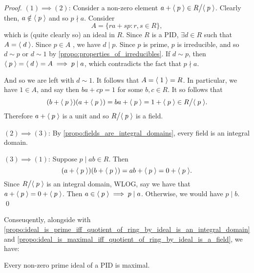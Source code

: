 \begin{proof}
  $(1) \implies (2)$: Consider a non-zero element $a + \langle \; p \; \rangle \in R \big/ \langle \; p \; \rangle$. Clearly then, $a \notin \langle \; p \; \rangle$ and so $p \nmid a$. Consider
  \begin{equation*}
    A = \{ ra + sp : r, s \in R \},
  \end{equation*}
  which is (quite clearly so) an ideal in $R$. Since $R$ is a PID, $\exists d \in R$ such that $A = \langle \; d \; \rangle$. Since $p \in A$ , we have $d \mid p$. Since $p$ is prime, $p$ is irreducible, and so $d \sim p$ or $d \sim 1$ by \cref{propo:properties_of_irreducibles}. If $d \sim p$, then $\langle \; p \; \rangle = \langle \; d \; \rangle = A \implies p \mid a$, which contradicts the fact that $p \nmid a$.

  And so we are left with $d \sim 1$. It follows that $A = \langle \; 1 \; \rangle = R$. In particular, we have $1 \in A$, and say then $ba + cp = 1$ for some $b, c \in R$. It so follows that
  \begin{equation*}
    (b + \langle \; p \; \rangle)(a + \langle \; p \; \rangle) = ba + \langle \; p \; \rangle = 1 + \langle \; p \; \rangle \in R \big/ \langle \; p \; \rangle.
  \end{equation*}
  Therefore $a + \langle \; p \; \rangle$ is a unit and so $R \big/ \langle \; p \; \rangle$ is a field.

  \noindent $(2) \implies (3)$: By \cref{propo:fields_are_integral_domains}, every field is an integral domain.

  \noindent $(3) \implies (1)$: Suppose $p \mid ab \in R$. Then
  \begin{equation*}
    (a + \langle \; p \; \rangle) (b + \langle \; p \; \rangle) = ab + \langle \; p \; \rangle = 0 + \langle \; p \; \rangle.
  \end{equation*}
  Since $R \big/ \langle \; p \; \rangle$ is an integral domain, WLOG, say we have that $a + \langle \; p \; \rangle = 0 + \langle \; p \; \rangle$. Then $a \in \langle \; p \; \rangle \implies p \mid a$. Otherwise, we would have $p \mid b$. \qed
\end{proof}

Conseuqently, alongside with \cref{propo:ideal_is_prime_iff_quotient_of_ring_by_ideal_is_an_integral_domain} and \cref{propo:ideal_is_maximal_iff_quotient_of_ring_by_ideal_is_a_field}, we have:

\begin{crly}
\label{crly:non_zero_prime_ideals_in_a_pid_are_maximal}
Every non-zero prime ideal of a PID is maximal.
\end{crly}


